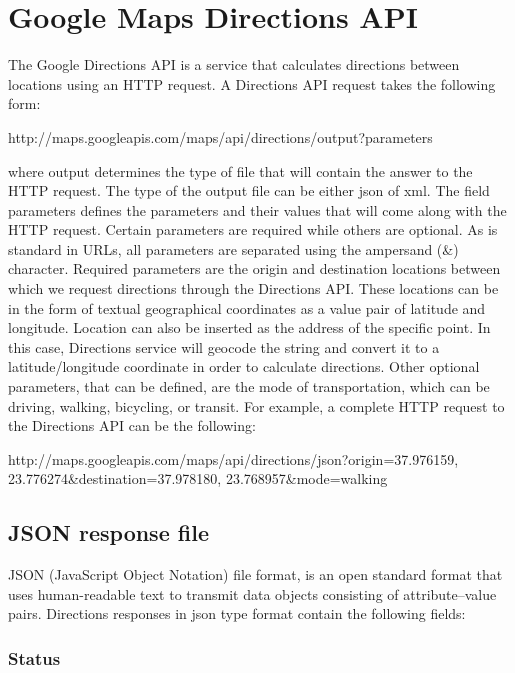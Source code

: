 \section{Google Maps Directions API}

The Google Directions API \cite{16} is a service that calculates directions between locations using an HTTP request. A Directions API request takes the following form:
\begin{center}
  http://maps.googleapis.com/maps/api/directions/output?parameters
\end{center}

where output determines the type of file that will contain the answer to the HTTP request. The type of the output file can be either json of xml. 
The field parameters 
defines the parameters and their values that will come along with the HTTP request. Certain parameters are required while others are optional. As is standard 
in URLs, all parameters are separated using the ampersand (\&) character. Required parameters are the origin and destination locations between which we 
request directions through the Directions API. These locations can be in the form of textual geographical coordinates as a value pair of latitude and 
longitude. Location can also be inserted as the address of the specific point. In this case, Directions service will geocode the string and convert it to 
a latitude/longitude coordinate in order to calculate directions. Other optional parameters, that can be defined, are the mode of transportation, 
which can be driving, walking, bicycling, or transit. For example, a complete HTTP request to the Directions API can be the following:

\begin{center}
 http://maps.googleapis.com/maps/api/directions/json?origin=37.976159, 23.776274\&destination=37.978180, 23.768957\&mode=walking
\end{center}

\subsection{JSON response file}

JSON (JavaScript Object Notation) file format, is an open standard format that uses human-readable text to transmit data objects consisting of attribute–value pairs. 
Directions responses in json type format contain the following fields: 

\subsubsection{Status}

